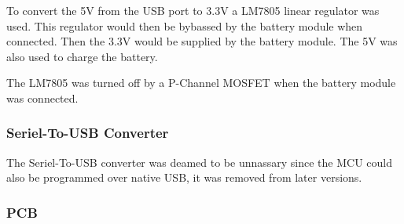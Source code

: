         To convert the 5V from the USB port to 3.3V a LM7805 linear regulator was used. This regulator
        would then be bybassed by the battery module when connected. Then the 3.3V would be supplied by the
        battery module. The 5V was also used to charge the battery.

        The LM7805 was turned off by a P-Channel MOSFET when the battery module was connected.

    \subsubsection{Seriel-To-USB Converter}
        The Seriel-To-USB converter was deamed to be unnassary since the MCU could also be programmed 
        over native USB, it was removed from later versions.

    \subsubsection{PCB}